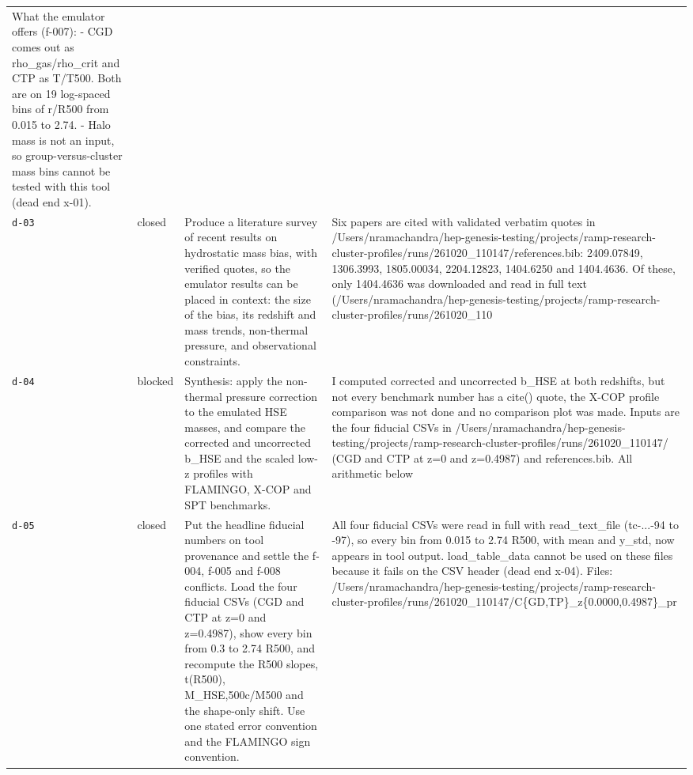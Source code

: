 \documentclass[11pt,a4paper]{article}
\begin{document}
\begin{longtable}{@{}p{}p{}p{}p{}@{}}
What the emulator offers (f-007):
- CGD comes out as rho\_gas/rho\_crit and CTP as T/T500. Both are on 19 log-spaced bins of r/R500 from 0.015 to 2.74.
- Halo mass is not an input, so group-versus-cluster mass bins cannot be tested with this tool (dead end x-01). \\
\texttt{d-03} & closed & Produce a literature survey of recent results on hydrostatic mass bias, with verified quotes, so the emulator results can be placed in context: the size of the bias, its redshift and mass trends, non-thermal pressure, and observational constraints. & Six papers are cited with validated verbatim quotes in /Users/nramachandra/hep-genesis-testing/projects/ramp-research-cluster-profiles/runs/261020\_110147/references.bib: 2409.07849, 1306.3993, 1805.00034, 2204.12823, 1404.6250 and 1404.4636. Of these, only 1404.4636 was downloaded and read in full text (/Users/nramachandra/hep-genesis-testing/projects/ramp-research-cluster-profiles/runs/261020\_110 \\
\texttt{d-04} & blocked & Synthesis: apply the non-thermal pressure correction to the emulated HSE masses, and compare the corrected and uncorrected b\_HSE and the scaled low-z profiles with FLAMINGO, X-COP and SPT benchmarks. & I computed corrected and uncorrected b\_HSE at both redshifts, but not every benchmark number has a cite() quote, the X-COP profile comparison was not done and no comparison plot was made. Inputs are the four fiducial CSVs in /Users/nramachandra/hep-genesis-testing/projects/ramp-research-cluster-profiles/runs/261020\_110147/ (CGD and CTP at z=0 and z=0.4987) and references.bib. All arithmetic below  \\
\texttt{d-05} & closed & Put the headline fiducial numbers on tool provenance and settle the f-004, f-005 and f-008 conflicts. Load the four fiducial CSVs (CGD and CTP at z=0 and z=0.4987), show every bin from 0.3 to 2.74 R500, and recompute the R500 slopes, t(R500), M\_HSE,500c/M500 and the shape-only shift. Use one stated error convention and the FLAMINGO sign convention. & All four fiducial CSVs were read in full with read\_text\_file (tc-...-94 to -97), so every bin from 0.015 to 2.74 R500, with mean and y\_std, now appears in tool output. load\_table\_data cannot be used on these files because it fails on the CSV header (dead end x-04). Files: /Users/nramachandra/hep-genesis-testing/projects/ramp-research-cluster-profiles/runs/261020\_110147/C\{GD,TP\}\_z\{0.0000,0.4987\}\_pr \\

\end{longtable}
\end{document}
